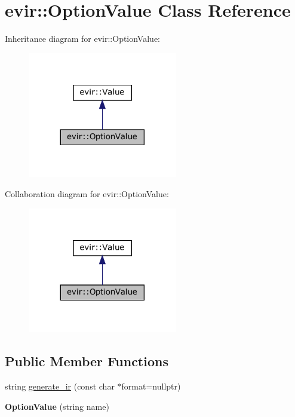 \hypertarget{classevir_1_1OptionValue}{}\section{evir\+:\+:Option\+Value Class Reference}
\label{classevir_1_1OptionValue}


Inheritance diagram for evir\+:\+:Option\+Value\+:
\nopagebreak
\begin{figure}[H]
\begin{center}
\leavevmode
\includegraphics[width=185pt]{classevir_1_1OptionValue__inherit__graph}
\end{center}
\end{figure}


Collaboration diagram for evir\+:\+:Option\+Value\+:
\nopagebreak
\begin{figure}[H]
\begin{center}
\leavevmode
\includegraphics[width=185pt]{classevir_1_1OptionValue__coll__graph}
\end{center}
\end{figure}
\subsection*{Public Member Functions}
\begin{DoxyCompactItemize}
\item 
string \hyperlink{classevir_1_1OptionValue_a8bd21c46fc29805637eed4473f1fa371}{generate\+\_\+ir} (const char $\ast$format=nullptr)
\item 
\mbox{\label{classevir_1_1OptionValue_aa1747703bb1bb354c6dc8c0b7d5b0766}} 
{\bfseries Option\+Value} (string name)
\end{DoxyCompactItemize}
